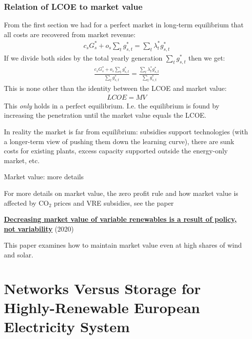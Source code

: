 \documentclass[10pt,aspectratio=169,dvipsnames]{beamer}
\def\l{\lambda}
\begin{document}
\begin{frame}
  \frametitle{Relation of LCOE to market value}

  From the first section we had for a perfect market in long-term equilibrium that all costs are recovered from market revenue:
  \begin{align*}
    c_s G_s^* +  o_{s} \sum_{t}  g_{s,t}^* =  \sum_{t} \l_t^* g_{s,t}^*
  \end{align*}
  If we divide both sides by the total yearly generation $\sum_{t} g_{s,t}^*$ then we get:
  \begin{align*}
    \frac{c_s G_s^* +  o_{s} \sum_{t}  g_{s,t}^*}{\sum_{t} g_{s,t}^*} =  \frac{\sum_{t} \l_t^* g_{s,t}^*}{\sum_{t} g_{s,t}^*}
  \end{align*}
  This is none other than the identity between the LCOE and market value:
  \begin{align*}
    LCOE = MV
  \end{align*}
  This \emph{only} holds in a perfect equilibrium. I.e. the
  equilibrium is found by increasing the penetration until the market
  value equals the LCOE.

  In reality the market is far from equilibrium: subsidies support
  technologies (with a longer-term view of pushing them down the
  learning curve), there are sunk costs for existing plants, excess
  capacity supported outside the energy-only market, etc.
\end{frame}

\begin{frame}{Market value: more details}

  For more details on market value, the zero profit rule and how market value is affected by CO$_2$ prices and VRE subsidies, see the paper

  \href{https://arxiv.org/abs/2002.05209}{\bf\color{blue}\underline{Decreasing market value of variable renewables is a result of policy, not variability}} (2020)

  This paper examines how to maintain market value even at high shares of wind and solar.


\end{frame}

\section{Networks Versus Storage for Highly-Renewable European Electricity System}
\end{document}

